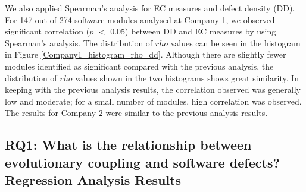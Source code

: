 \documentclass[times]{smrauth}
\begin{document}
%

We also applied Spearman's analysis for EC measures and defect density (DD). For 147 out of 274 software modules analysed at Company 1, we observed significant correlation ($p$ $<$ 0.05) between DD and EC measures by using Spearman's analysis. The distribution of $rho$ values can be seen in the histogram in Figure \ref{Company1_histogram_rho_dd}. Although there are slightly fewer modules identified as significant compared with the previous analysis, the distribution of $rho$ values shown in the two histograms shows great similarity. In keeping with the previous analysis results, the correlation observed was generally low and moderate; for a small number of modules, high correlation was observed. The results for Company 2 were similar to the previous analysis results.



%

\subsection{RQ1: What is the relationship between evolutionary coupling and software defects? Regression Analysis Results}
\end{document}
